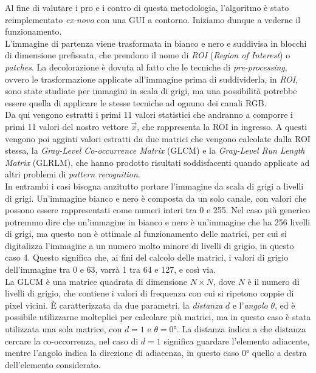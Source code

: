 Al fine di valutare i pro e i contro di questa metodologia, l'algoritmo
è stato reimplementato {\it ex-novo} con una GUI a contorno.
Iniziamo dunque a vederne il funzionamento.\\
L'immagine di partenza viene trasformata in bianco e nero e
suddivisa in blocchi di dimensione prefissata, che prendono il nome di
{\it ROI} ({\it Region of Interest}) o {\it patches}.
La decolorazione è dovuta al fatto che le tecniche di {\it pre-processing},
ovvero le trasformazione applicate all'immagine prima di suddividerla, in {\it ROI},
sono state studiate per immagini in scala di grigi, ma una possibilità potrebbe
essere quella di applicare le stesse tecniche ad ognuno dei canali RGB.\\
Da qui vengono estratti i primi 11 valori statistici che andranno a comporre
i primi 11 valori del nostro vettore $\vec{x}$, che rappresenta la ROI in
ingresso.
A questi vengono poi agginti valori estratti da due matrici che vengono
calcolate dalla ROI stessa, la {\it Gray-Level Co-occurrence Matrix} (GLCM)
e la {\it Gray-Level Run Length Matrix} (GLRLM), che hanno prodotto
risultati soddisfacenti quando applicate ad altri problemi di
{\it pattern recognition}.\cite{GLCM}\\
In entrambi i casi bisogna anzitutto portare l'immagine da scala di grigi
a livelli di grigi.
Un'immagine bianco e nero è composta da un solo canale, con valori che possono
essere rappresentati come numeri interi tra 0 e 255.
Nel caso più generico potremmo dire che un'immagine in bianco e nero
è un'immagine che ha 256 livelli di grigi, ma questo non è ottimale al
funzionamento delle matrici, per cui si digitalizza l'immagine a un numero molto
minore di livelli di grigio, in questo caso 4.
Questo significa che, ai fini del calcolo delle matrici, i valori di grigio
dell'immagine tra 0 e 63, varrà 1 tra 64 e 127, e così via.\\
La GLCM è una matrice quadrata di dimensione $N \times N$, dove $N$ è il
numero di livelli di grigio, che contiene i valori di frequenza con cui
si ripetono coppie di pixel vicini.
È caratterizzata da due parametri, la {\it distanza} $d$ e l'{\it angolo} $\theta$,
ed è possibile utilizzarne molteplici per calcolare più matrici,
ma in questo caso è stata utilizzata una sola matrice, con $d=1$ e $\theta=0$°.
La distanza indica a che distanza cercare la co-occorrenza, nel caso di $d=1$
significa guardare l'elemento adiacente, mentre l'angolo indica la direzione
di adiacenza, in questo caso $0$° quello a destra dell'elemento considerato.

